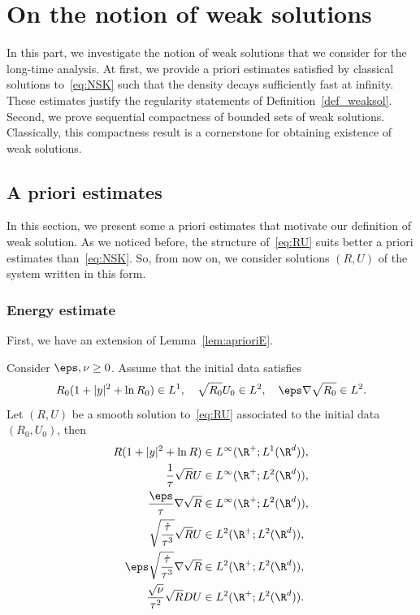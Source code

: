 \section{On the notion of weak solutions}\label{sec:compactness}

In this part, we investigate the notion of weak solutions that we consider for the long-time analysis. At first, we provide a priori estimates satisfied by classical solutions to~\eqref{eq:NSK} such that the density decays sufficiently fast at infinity. These estimates justify the regularity statements of Definition~\ref{def_weaksol}. Second, we prove sequential compactness of bounded sets of weak solutions. Classically, this compactness result is a cornerstone for obtaining existence of weak solutions.

\subsection{A priori estimates}\label{sec:apriori}

In this section, we present some a priori estimates that motivate our definition of weak solution. As we noticed before, the structure of~\eqref{eq:RU} suits better a priori estimates than~\eqref{eq:NSK}. So, from now on, we consider solutions $(R,U)$ of the system written in this form.

\subsubsection{Energy estimate}

First, we have an extension of Lemma~\ref{lem:aprioriE}.

\begin{prop}\label{prop:apriori-energy}
Consider $\eps, \nu \ge 0$. Assume that the initial data satisfies
\[
R_0(1+|y|^2 + \ln R_0) \in L^1, \quad
\sqrt{R_0} U_0 \in L^2, \quad
\eps \nabla \sqrt{R_0} \in L^2.
\]
Let $(R,U)$ be a smooth solution to~\eqref{eq:RU} associated to the initial data $(R_0,U_0)$, then
\begin{equation}\label{eq:apriori-energy}
\begin{aligned}
R(1+|y|^2 + \ln R) &\in L^\infty(\R^+ ; L^1(\R^d)), \\
\frac{1}{\tau} \sqrt{R} U &\in L^\infty(\R^+ ; L^2 (\R^d)), \\
\frac{\eps}{\tau} \nabla \sqrt{R} &\in L^\infty(\R^+ ; L^2 (\R^d)), \\
\sqrt{\frac{\dot \tau}{\tau^3}} \sqrt R U &\in L^2(\R^+ ; L^2 (\R^d)), \\
\eps \sqrt{\frac{\dot \tau}{\tau^3}} \nabla \sqrt{R} &\in L^2(\R^+ ; L^2 (\R^d)), \\
\frac{\sqrt \nu}{\tau^2} \sqrt{R} DU &\in L^2(\R^+ ; L^2 (\R^d)).
\end{aligned}
\end{equation}
\end{prop}

